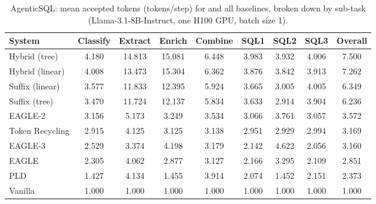 \begin{table}[htbp]
\centering
\caption{AgenticSQL: mean accepted tokens (tokens/step) for \SuffixDecoding and all baselines, broken down by sub-task (Llama-3.1-8B-Instruct, one H100 GPU, batch size 1).}
\label{suffixdecoding:tab:sql-mat}
\small
\begin{adjustbox}{width=\linewidth}
\begin{tabular}{lcccccccc}
\toprule
\textbf{System} & Classify & Extract & Enrich & Combine & SQL1 & SQL2 & SQL3 & \textbf{Overall} \\
\midrule
Hybrid (tree) & 4.180 & 14.813 & 15.081 & 6.448 & 3.983 & 3.932 & 4.006 & 7.500 \\
Hybrid (linear) & 4.008 & 13.473 & 15.304 & 6.362 & 3.876 & 3.842 & 3.913 & 7.262 \\
Suffix (linear) & 3.577 & 11.833 & 12.395 & 5.924 & 3.665 & 3.005 & 4.005 & 6.349 \\
Suffix (tree) & 3.470 & 11.724 & 12.137 & 5.834 & 3.633 & 2.914 & 3.904 & 6.236 \\
EAGLE-2 & 3.156 & 5.173 & 3.249 & 3.534 & 3.066 & 3.761 & 3.057 & 3.572 \\
Token Recycling & 2.915 & 4.125 & 3.125 & 3.138 & 2.951 & 2.929 & 2.994 & 3.169 \\
EAGLE-3 & 2.529 & 3.374 & 4.198 & 3.179 & 2.142 & 4.622 & 2.056 & 3.160 \\
EAGLE & 2.305 & 4.062 & 2.877 & 3.127 & 2.166 & 3.295 & 2.109 & 2.851 \\
PLD & 1.427 & 4.134 & 1.455 & 3.914 & 2.074 & 1.452 & 2.151 & 2.373 \\
Vanilla & 1.000 & 1.000 & 1.000 & 1.000 & 1.000 & 1.000 & 1.000 & 1.000 \\
\bottomrule
\end{tabular}
\end{adjustbox}
\end{table}

